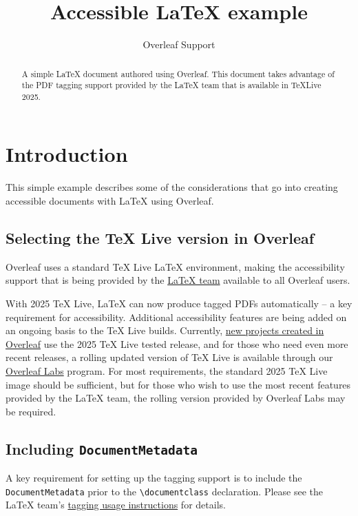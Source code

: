 \documentclass[12pt]{article}
\title{Accessible LaTeX example}
\author{Overleaf Support}
\begin{document}
\maketitle

\begin{abstract}
A simple \LaTeX{} document authored using Overleaf. This document takes advantage of the PDF tagging support provided by the \LaTeX{} team that is available in TeXLive 2025.
\end{abstract}

\section{Introduction}
This simple example describes some of the considerations that go into creating accessible documents with \LaTeX{} using Overleaf.

\subsection{Selecting the TeX Live version in Overleaf}

Overleaf uses a standard TeX Live \LaTeX{} environment, making the accessibility support that is being provided by the \href{https://www.latex-project.org/}{\texorpdfstring{\LaTeX{}}{LaTeX} team} available to all Overleaf users.

With 2025 TeX Live, \LaTeX{} can now produce tagged PDFs automatically -- a key requirement for accessibility. Additional accessibility features are being added on an ongoing basis to the TeX Live builds. Currently, \href{https://www.overleaf.com/blog/tex-live-2025-is-now-available}{new projects created in Overleaf} use the 2025 TeX Live tested release, and for those who need even more recent releases, a rolling updated version of TeX Live is available through our \href{https://www.overleaf.com/labs/participate}{Overleaf Labs} program. For most requirements, the standard 2025 TeX Live image should be sufficient, but for those who wish to use the most recent features provided by the \LaTeX{} team, the rolling version provided by Overleaf Labs may be required.

\subsection[Including DocumentMetadata]{Including \texttt{DocumentMetadata}}
A key requirement for setting up the tagging support is to include the \texttt{DocumentMetadata} prior to the \verb|\documentclass| declaration. Please see the \LaTeX{} team's \href{https://latex3.github.io/tagging-project/documentation/usage-instructions}{tagging usage instructions} for details.
\end{document}

